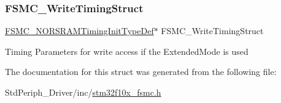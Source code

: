 \subsubsection{\texorpdfstring{FSMC\_WriteTimingStruct}{FSMC\_WriteTimingStruct}}
{\footnotesize\ttfamily \mbox{\hyperlink{struct_f_s_m_c___n_o_r_s_r_a_m_timing_init_type_def}{F\+S\+M\+C\+\_\+\+N\+O\+R\+S\+R\+A\+M\+Timing\+Init\+Type\+Def}}$\ast$ F\+S\+M\+C\+\_\+\+Write\+Timing\+Struct}

Timing Parameters for write access if the Extended\+Mode is used 

The documentation for this struct was generated from the following file\+:\begin{DoxyCompactItemize}
\item 
Std\+Periph\+\_\+\+Driver/inc/\mbox{\hyperlink{stm32f10x__fsmc_8h}{stm32f10x\+\_\+fsmc.\+h}}\end{DoxyCompactItemize}
